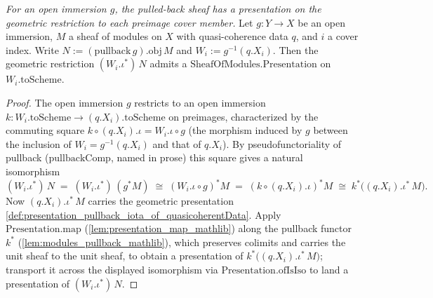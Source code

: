 \begin{definition}
  \label{def:presentation_pullback_iota_preimage}
  \textit{For an open immersion $g$, the pulled-back sheaf has a presentation on the geometric
  restriction to each preimage cover member.}
  Let \(g : Y \to X\) be an open immersion, \(M\) a sheaf of modules on \(X\) with quasi-coherence data
  \(q\), and \(i\) a cover index. Write \(N := (\mathrm{pullback}\,g).\mathrm{obj}\,M\) and
  \(W_i := g^{-1}(q.X_i)\). Then the geometric restriction
  \((W_i.\iota^{*})\,N\) admits a \(\mathrm{SheafOfModules.Presentation}\) on \(W_i.\mathrm{toScheme}\).
\end{definition}
\begin{proof}
  The open immersion \(g\) restricts to an open immersion
  \(k : W_i.\mathrm{toScheme} \to (q.X_i).\mathrm{toScheme}\) on preimages, characterized by the
  commuting square \(k \circ (q.X_i).\iota = W_i.\iota \circ g\) (the morphism induced by \(g\) between
  the inclusion of \(W_i = g^{-1}(q.X_i)\) and that of \(q.X_i\)). By pseudofunctoriality of pullback
  (\(\mathrm{pullbackComp}\), named in prose) this square gives a natural isomorphism
  \[
    (W_i.\iota^{*})\,N \;=\; (W_i.\iota^{*})\,(g^{*}M)
      \;\cong\; (W_i.\iota \circ g)^{*}M
      \;=\; (k \circ (q.X_i).\iota)^{*}M
      \;\cong\; k^{*}\bigl((q.X_i).\iota^{*}\,M\bigr) .
  \]
  Now \((q.X_i).\iota^{*}\,M\) carries the geometric presentation
  \cref{def:presentation_pullback_iota_of_quasicoherentData}. Apply \(\mathrm{Presentation.map}\)
  (\cref{lem:presentation_map_mathlib}) along the pullback functor \(k^{*}\)
  (\cref{lem:modules_pullback_mathlib}), which preserves colimits and carries the unit sheaf to the
  unit sheaf, to obtain a presentation of \(k^{*}\bigl((q.X_i).\iota^{*}\,M\bigr)\); transport it across
  the displayed isomorphism via \(\mathrm{Presentation.ofIsIso}\) to land a presentation of
  \((W_i.\iota^{*})\,N\).
\end{proof}

